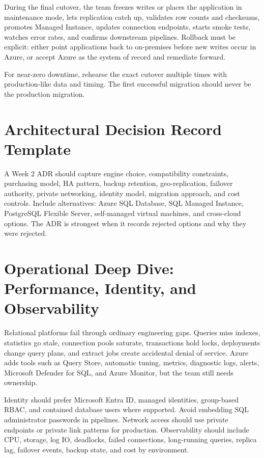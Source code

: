 During the final cutover, the team freezes writes or places the application in maintenance mode, lets replication catch up, validates row counts and checksums, promotes Managed Instance, updates connection endpoints, starts smoke tests, watches error rates, and confirms downstream pipelines. Rollback must be explicit: either point applications back to on-premises before new writes occur in Azure, or accept Azure as the system of record and remediate forward.

\begin{tipbox}
For near-zero downtime, rehearse the exact cutover multiple times with production-like data and timing. The first successful migration should never be the production migration.
\end{tipbox}

\section{Architectural Decision Record Template}
A Week 2 ADR should capture engine choice, compatibility constraints, purchasing model, HA pattern, backup retention, geo-replication, failover authority, private networking, identity model, migration approach, and cost controls. Include alternatives: Azure SQL Database, SQL Managed Instance, PostgreSQL Flexible Server, self-managed virtual machines, and cross-cloud options. The ADR is strongest when it records rejected options and why they were rejected.

\section{Operational Deep Dive: Performance, Identity, and Observability}
Relational platforms fail through ordinary engineering gaps. Queries miss indexes, statistics go stale, connection pools saturate, transactions hold locks, deployments change query plans, and extract jobs create accidental denial of service. Azure adds tools such as Query Store, automatic tuning, metrics, diagnostic logs, alerts, Microsoft Defender for SQL, and Azure Monitor, but the team still needs ownership.

Identity should prefer Microsoft Entra ID, managed identities, group-based RBAC, and contained database users where supported. Avoid embedding SQL administrator passwords in pipelines. Network access should use private endpoints or private link patterns for production. Observability should include CPU, storage, log IO, deadlocks, failed connections, long-running queries, replica lag, failover events, backup state, and cost by environment.

